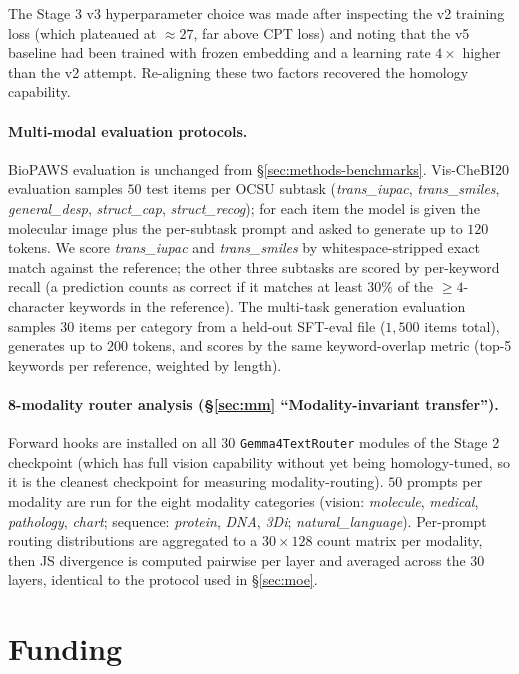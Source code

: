 \documentclass[11pt]{article}
\begin{document}
The Stage 3 v3 hyperparameter choice was made after inspecting the v2 training loss (which plateaued at $\approx 27$, far above CPT loss) and noting that the v5 baseline had been trained with frozen embedding and a learning rate $4\times$ higher than the v2 attempt. Re-aligning these two factors recovered the homology capability.

\paragraph{Multi-modal evaluation protocols.} BioPAWS evaluation is unchanged from \S\ref{sec:methods-benchmarks}. Vis-CheBI20 evaluation samples $50$ test items per OCSU subtask (\textit{trans\_iupac}, \textit{trans\_smiles}, \textit{general\_desp}, \textit{struct\_cap}, \textit{struct\_recog}); for each item the model is given the molecular image plus the per-subtask prompt and asked to generate up to $120$ tokens. We score \textit{trans\_iupac} and \textit{trans\_smiles} by whitespace-stripped exact match against the reference; the other three subtasks are scored by per-keyword recall (a prediction counts as correct if it matches at least $30\%$ of the $\geq 4$-character keywords in the reference). The multi-task generation evaluation samples $30$ items per category from a held-out SFT-eval file ($1{,}500$ items total), generates up to $200$ tokens, and scores by the same keyword-overlap metric (top-5 keywords per reference, weighted by length).

\paragraph{8-modality router analysis (\S\ref{sec:mm} ``Modality-invariant transfer'').} Forward hooks are installed on all $30$ \texttt{Gemma4TextRouter} modules of the Stage 2 checkpoint (which has full vision capability without yet being homology-tuned, so it is the cleanest checkpoint for measuring modality-routing). $50$ prompts per modality are run for the eight modality categories (vision: \textit{molecule}, \textit{medical}, \textit{pathology}, \textit{chart}; sequence: \textit{protein}, \textit{DNA}, \textit{3Di}; \textit{natural\_language}). Per-prompt routing distributions are aggregated to a $30\!\times\!128$ count matrix per modality, then JS divergence is computed pairwise per layer and averaged across the $30$ layers, identical to the protocol used in \S\ref{sec:moe}.


\section*{Funding}
\end{document}
